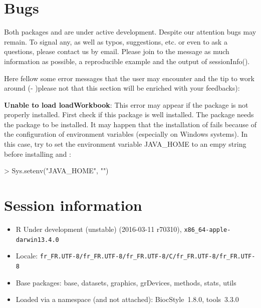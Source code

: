 \documentclass[12pt]{article}
\begin{document}



\section{Bugs}\label{sec:sessionBugs}

Both packages  and  are under active development. Despite our attention bugs may remain. To signal any, as well as typos, suggestions, etc. or even to ask a questions, please contact us by email. Please join to the message as much information as possible, a reproducible example and the output of sessionInfo(). 

Here fellow some error messages that the user may encounter and the tip to work around (- )please not that this section will be enriched with your feedbacks):

\textbf{Unable to load loadWorkbook}: This error may appear if the package  is not properly installed. First check if this package is well installed. The package  needs the package  to be installed. It may happen that the installation of  fails because of the configuration of environment variables (especially on Windows systems). In this case, try to set the environment variable JAVA\_HOME to an empy string before installing  and :
\begin{Schunk}
\begin{Sinput}
> Sys.setenv("JAVA_HOME", "")
\end{Sinput}
\end{Schunk}




\section{Session information}\label{sec:sessionInfo}
\begin{itemize}\raggedright
  \item R Under development (unstable) (2016-03-11 r70310), \verb|x86_64-apple-darwin13.4.0|
  \item Locale: \verb|fr_FR.UTF-8/fr_FR.UTF-8/fr_FR.UTF-8/C/fr_FR.UTF-8/fr_FR.UTF-8|
  \item Base packages: base, datasets, graphics, grDevices, methods, stats,
    utils
  \item Loaded via a namespace (and not attached): BiocStyle~1.8.0, tools~3.3.0
\end{itemize}
\end{document}
